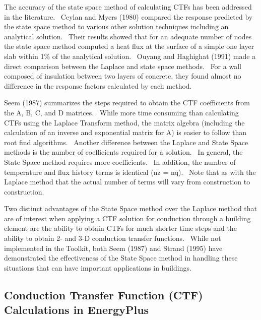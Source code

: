 The accuracy of the state space method of calculating CTFs has been addressed in the literature.~ Ceylan and Myers (1980) compared the response predicted by the state space method to various other solution techniques including an analytical solution.~ Their results showed that for an adequate number of nodes the state space method computed a heat flux at the surface of a simple one layer slab within 1\% of the analytical solution.~ Ouyang and Haghighat (1991) made a direct comparison between the Laplace and state space methods.~ For a wall composed of insulation between two layers of concrete, they found almost no difference in the response factors calculated by each method.

Seem (1987) summarizes the steps required to obtain the CTF coefficients from the A, B, C, and D matrices.~ While more time consuming than calculating CTFs using the Laplace Transform method, the matrix algebra (including the calculation of an inverse and exponential matrix for A) is easier to follow than root find algorithms.~ Another difference between the Laplace and State Space methods is the number of coefficients required for a solution.~ In general, the State Space method requires more coefficients.~ In addition, the number of temperature and flux history terms is identical (nz = nq).~ Note that as with the Laplace method that the actual number of terms will vary from construction to construction.

Two distinct advantages of the State Space method over the Laplace method that are of interest when applying a CTF solution for conduction through a building element are the ability to obtain CTFs for much shorter time steps and the ability to obtain 2- and 3-D conduction transfer functions.~ While not implemented in the Toolkit, both Seem (1987) and Strand (1995) have demonstrated the effectiveness of the State Space method in handling these situations that can have important applications in buildings.

\subsection{Conduction Transfer Function (CTF) Calculations in EnergyPlus}\label{conduction-transfer-function-ctf-calculations-in-energyplus}

